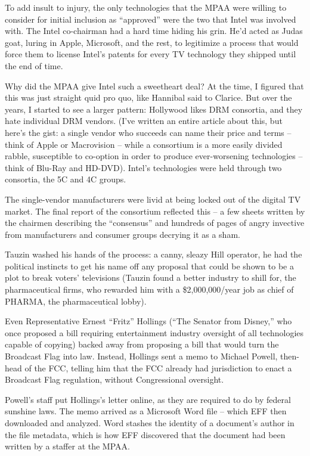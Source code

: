 To add insult to injury, the only technologies that the MPAA were
willing to consider for initial inclusion as ``approved'' were the
two that Intel was involved with. The Intel co-chairman had a hard
time hiding his grin. He'd acted as Judas goat, luring in Apple,
Microsoft, and the rest, to legitimize a process that would force
them to license Intel's patents for every TV technology they
shipped until the end of time.

Why did the MPAA give Intel such a sweetheart deal? At the time, I
figured that this was just straight quid pro quo, like Hannibal
said to Clarice. But over the years, I started to see a larger
pattern: Hollywood likes DRM consortia, and they hate individual
DRM vendors. (I've written an entire article about this, but here's
the gist: a single vendor who succeeds can name their price and
terms -- think of Apple or Macrovision -- while a consortium is a
more easily divided rabble, susceptible to co-option in order to
produce ever-worsening technologies -- think of Blu-Ray and
HD-DVD). Intel's technologies were held through two consortia, the
5C and 4C groups.

The single-vendor manufacturers were livid at being locked out of
the digital TV market. The final report of the consortium reflected
this -- a few sheets written by the chairmen describing the
``consensus'' and hundreds of pages of angry invective from
manufacturers and consumer groups decrying it as a sham.

Tauzin washed his hands of the process: a canny, sleazy Hill
operator, he had the political instincts to get his name off any
proposal that could be shown to be a plot to break voters'
televisions (Tauzin found a better industry to shill for, the
pharmaceutical firms, who rewarded him with a \$2,000,000/year job
as chief of PHARMA, the pharmaceutical lobby).

Even Representative Ernest ``Fritz'' Hollings (``The Senator from
Disney,'' who once proposed a bill requiring entertainment industry
oversight of all technologies capable of copying) backed away from
proposing a bill that would turn the Broadcast Flag into law.
Instead, Hollings sent a memo to Michael Powell, then-head of the
FCC, telling him that the FCC already had jurisdiction to enact a
Broadcast Flag regulation, without Congressional oversight.

Powell's staff put Hollings's letter online, as they are required
to do by federal sunshine laws. The memo arrived as a Microsoft
Word file -- which EFF then downloaded and analyzed. Word stashes
the identity of a document's author in the file metadata, which is
how EFF discovered that the document had been written by a staffer
at the MPAA.

